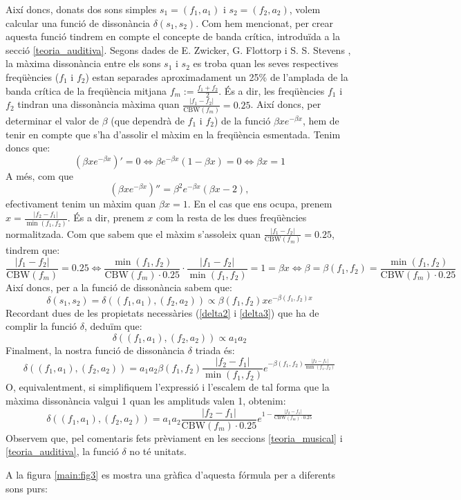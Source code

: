 \documentclass{article}
\theoremstyle{math}
\theoremstyle{TheoremNum}
\newcommand{\0}{\ensuremath{\vb{0}}}
\begin{document}
Així doncs, donats dos sons simples $s_1=(f_1,a_1)$ i $s_2=(f_2,a_2)$, volem calcular una funció de dissonància $\delta(s_1,s_2)$. Com hem mencionat, per crear aquesta funció tindrem en compte el concepte de banda crítica, introduïda a la secció \ref{teoria_auditiva}. Segons dades de E. Zwicker, G. Flottorp i S. S. Stevens \cite{zwicker}, la màxima dissonància entre els sons $s_1$ i $s_2$ es troba quan les seves respectives freqüències ($f_1$ i $f_2$) estan separades aproximadament un 25\% de l'amplada de la banda crítica de la freqüència mitjana $f_m:=\frac{f_1+f_2}{2}$. És a dir, les freqüències $f_1$ i $f_2$ tindran una dissonància màxima quan $\frac{|f_1-f_2|}{\text{CBW}(f_m)}=0.25$. Així doncs, per determinar el valor de $\beta$ (que dependrà de $f_1$ i $f_2$) de la funció $\beta xe^{-\beta x}$, hem de tenir en compte que s'ha d'assolir el màxim en la freqüència esmentada. Tenim doncs que:
$$\left(\beta xe^{-\beta x}\right)'=0\iff \beta e^{-\beta x}(1-\beta x)=0\iff\beta x=1$$ A més, com que $$\left(\beta xe^{-\beta x}\right)''=\beta^2e^{-\beta x}(\beta x-2),$$ efectivament tenim un màxim quan $\beta x=1$.
En el cas que ens ocupa, prenem $x=\frac{|f_2-f_1|}{\min(f_1,f_2)}$. És a dir, prenem $x$ com la resta de les dues freqüències normalitzada. Com que sabem que el màxim s'assoleix quan $\frac{|f_1-f_2|}{\text{CBW}(f_m)}=0.25$, tindrem que:
$$\frac{|f_1-f_2|}{\text{CBW}(f_m)}=0.25\iff\frac{\min(f_1, f_2)}{\text{CBW}(f_m)\cdot 0.25}\cdot\frac{|f_1-f_2|}{\min(f_1, f_2)}=1=\beta x\iff\beta=\beta(f_1,f_2)=\frac{\min(f_1, f_2)}{\text{CBW}(f_m)\cdot 0.25}$$
Així doncs, per a la funció de dissonància sabem que: $$\delta(s_1,s_2)=\delta((f_1,a_1),(f_2,a_2))\propto\beta(f_1,f_2)xe^{-\beta(f_1,f_2)x}$$ Recordant dues de les propietats necessàries (\ref{delta2} i \ref{delta3}) que ha de complir la funció $\delta$, deduïm que: $$\delta((f_1,a_1),(f_2,a_2))\propto a_1a_2$$ Finalment, la nostra funció de dissonància $\delta$ triada és: $$\delta((f_1,a_1),(f_2,a_2))=a_1a_2\beta(f_1,f_2)\frac{|f_2-f_1|}{\min(f_1,f_2)}e^{-\beta(f_1,f_2)\frac{|f_2-f_1|}{\min(f_1,f_2)}}$$
O, equivalentment, si simplifiquem l'expressió i l'escalem de tal forma que la màxima dissonància valgui 1 quan les amplituds valen 1, obtenim: 
\begin{equation}
    \delta((f_1,a_1),(f_2,a_2))=a_1a_2\frac{|f_2-f_1|}{\text{CBW}(f_m)\cdot 0.25}e^{1-\frac{|f_2-f_1|}{\text{CBW}(f_m)\cdot 0.25}}
    \label{for:dissonancia}
\end{equation}
Observem que, pel comentaris fets prèviament en les seccions \ref{teoria_musical} i \ref{teoria_auditiva}, la funció $\delta$ no té unitats.\par\noindent A la figura \ref{main:fig3} es mostra una gràfica d'aquesta fórmula per a diferents sons purs:
\begin{center}
    
    \label{main:fig3}
\end{center}
\end{document}
